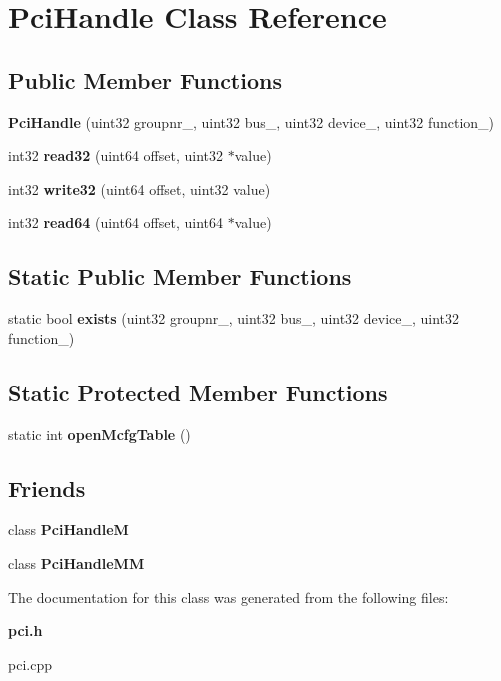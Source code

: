\section{Pci\+Handle Class Reference}
\label{classPciHandle}
\subsection*{Public Member Functions}
\begin{DoxyCompactItemize}
\item 
\mbox{\label{classPciHandle_a95e2bf928bd4438831c5a3b5b516efe6}} 
{\bfseries Pci\+Handle} (uint32 groupnr\+\_\+, uint32 bus\+\_\+, uint32 device\+\_\+, uint32 function\+\_\+)
\item 
\mbox{\label{classPciHandle_a76d15c7331d5fddd98d42e8a2316fb7c}} 
int32 {\bfseries read32} (uint64 offset, uint32 $\ast$value)
\item 
\mbox{\label{classPciHandle_a1975782af9943f65ba1312ff56fb30b1}} 
int32 {\bfseries write32} (uint64 offset, uint32 value)
\item 
\mbox{\label{classPciHandle_a2f965ad969df3add9c955eaaeb43e715}} 
int32 {\bfseries read64} (uint64 offset, uint64 $\ast$value)
\end{DoxyCompactItemize}
\subsection*{Static Public Member Functions}
\begin{DoxyCompactItemize}
\item 
\mbox{\label{classPciHandle_ac7eb1a7d50b8e345f75bdc8205592a92}} 
static bool {\bfseries exists} (uint32 groupnr\+\_\+, uint32 bus\+\_\+, uint32 device\+\_\+, uint32 function\+\_\+)
\end{DoxyCompactItemize}
\subsection*{Static Protected Member Functions}
\begin{DoxyCompactItemize}
\item 
\mbox{\label{classPciHandle_a9b5105f02947177df61ffe78ee81f022}} 
static int {\bfseries open\+Mcfg\+Table} ()
\end{DoxyCompactItemize}
\subsection*{Friends}
\begin{DoxyCompactItemize}
\item 
\mbox{\label{classPciHandle_ab4094f771b56aa375bccb1397e1a18bc}} 
class {\bfseries Pci\+HandleM}
\item 
\mbox{\label{classPciHandle_ad697cfb775e6784b97bf84b9f2a3938a}} 
class {\bfseries Pci\+Handle\+MM}
\end{DoxyCompactItemize}


The documentation for this class was generated from the following files\+:\begin{DoxyCompactItemize}
\item 
\textbf{ pci.\+h}\item 
pci.\+cpp\end{DoxyCompactItemize}
